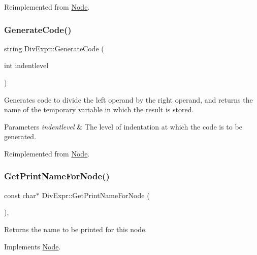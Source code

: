 Reimplemented from \hyperlink{class_node_a5f88d55c6f253a29def7ccc443d83d47}{Node}.

\mbox{\label{class_div_expr_a52d45f24aee4c323d57a133f4ee93b2d}} 
\subsubsection{\texorpdfstring{Generate\+Code()}{GenerateCode()}}
{\footnotesize\ttfamily string Div\+Expr\+::\+Generate\+Code (\begin{DoxyParamCaption}\item[{int}]{indentlevel }\end{DoxyParamCaption})\hspace{0.3cm}{\ttfamily [virtual]}}

Generates code to divide the left operand by the right operand, and returns the name of the temporary variable in which the result is stored. 
\begin{DoxyParams}{Parameters}
{\em indentlevel} & The level of indentation at which the code is to be generated. \\
\hline
\end{DoxyParams}


Reimplemented from \hyperlink{class_node_acb60e526730e8436056375a3055c2c32}{Node}.

\mbox{\label{class_div_expr_a1d35e7146d95f16a05fd37e3ed2184e8}} 
\subsubsection{\texorpdfstring{Get\+Print\+Name\+For\+Node()}{GetPrintNameForNode()}}
{\footnotesize\ttfamily const char$\ast$ Div\+Expr\+::\+Get\+Print\+Name\+For\+Node (\begin{DoxyParamCaption}{ }\end{DoxyParamCaption})\hspace{0.3cm}{\ttfamily [inline]}, {\ttfamily [virtual]}}

Returns the name to be printed for this node. 

Implements \hyperlink{class_node_a56e29657306ffb004d69c6929ae44269}{Node}.

